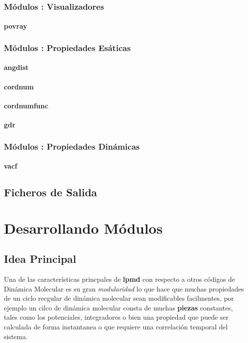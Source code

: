 \documentclass[a4paper,10pt]{scrbook}
\newcommand{\lpmd}{\textbf{lpmd }}
\begin{document}
\subsection{M\'odulos : Visualizadores}
\subsubsection{povray}

\subsection{M\'odulos : Propiedades Es\'aticas}
\subsubsection{angdist}
\subsubsection{cordnum}
\subsubsection{cordnumfunc}
\subsubsection{gdr}

\subsection{M\'odulos : Propiedades Din\'amicas}
\subsubsection{vacf}

\section{Ficheros de Salida}

\chapter{Desarrollando M\'odulos}
\label{chap:own}

\section{Idea Principal}

Una de las caracter\'isticas princpales de \lpmd con respecto a otros c\'odigos de Din\'amica Molecular es su gran \textit{modularidad} lo que hace que muchas propiedades de un ciclo recgular de din\'amica molecular sean modificables facilmentes, por ejemplo un cilco de din\'amica molecular consta de muchas \textbf{piezas} constantes, tales como los potenciales, integradores o bien una propiedad que puede ser calculada de forma instantanea o que requiere una correlaci\'on temporal del sistema.
\end{document}
